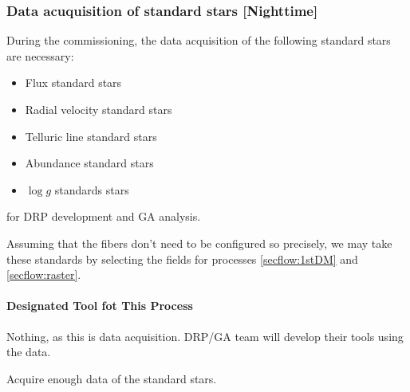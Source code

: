 \subsubsection{Data acuquisition of standard stars [Nighttime]}\label{secflow:StdStar}


During the commissioning, the data acquisition of the following standard stars are necessary:
\begin{itemize}
    \item Flux standard stars
    \item Radial velocity standard stars
    \item Telluric line standard stars
    \item Abundance standard stars
    \item $\log g$ standards stars
\end{itemize}
for DRP development and GA analysis.

Assuming that the fibers don't need to be configured so precisely, we may take these standards by selecting the fields for processes \ref{secflow:1stDM} and \ref{secflow:raster}.


\paragraph{Designated Tool fot This Process}
Nothing, as this is data acquisition.
DRP/GA team will develop their tools using the data.

\begin{itembox}[l]{}
Acquire enough data of the standard stars.

\end{itembox}